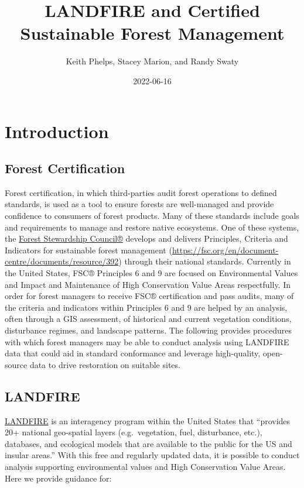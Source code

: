 \documentclass[
]{book}
\title{LANDFIRE and Certified Sustainable Forest Management}
\author{Keith Phelps, Stacey Marion, and Randy Swaty}
\date{2022-06-16}
\begin{document}
\maketitle

{
\setcounter{tocdepth}{1}
\tableofcontents
}
\hypertarget{Introduction}{%
\chapter{Introduction}\label{Introduction}}

\hypertarget{forest-certification}{%
\section{Forest Certification}\label{forest-certification}}

Forest certification, in which third-parties audit forest operations to defined standards, is used as a tool to ensure forests are well-managed and provide confidence to consumers of forest products. Many of these standards include goals and requirements to manage and restore native ecosystems. One of these systems, the \href{FSC®}{Forest Stewardship Council®} develops and delivers Principles, Criteria and Indicators for sustainable forest management (\url{https://fsc.org/en/document-centre/documents/resource/392}) through their national standards. Currently in the United States, FSC® Principles 6 and 9 are focused on Environmental Values and Impact and Maintenance of High Conservation Value Areas respectfully. In order for forest managers to receive FSC® certification and pass audits, many of the criteria and indicators within Principles 6 and 9 are helped by an analysis, often through a GIS assessment, of historical and current vegetation conditions, disturbance regimes, and landscape patterns. The following provides procedures with which forest managers may be able to conduct analysis using LANDFIRE data that could aid in standard conformance and leverage high-quality, open-source data to drive restoration on suitable sites.

\hypertarget{landfire}{%
\section{LANDFIRE}\label{landfire}}

\href{https://landfire.gov/}{LANDFIRE} is an interagency program within the United States that ``provides 20+ national geo-spatial layers (e.g.~vegetation, fuel, disturbance, etc.), databases, and ecological models that are available to the public for the US and insular areas.'' With this free and regularly updated data, it is possible to conduct analysis supporting environmental values and High Conservation Value Areas. Here we provide guidance for:
\end{document}

